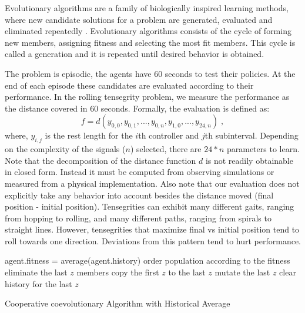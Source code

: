 \documentclass[twocolumn,10pt]{asme2ej}
\begin{document}
Evolutionary algorithms are a family of biologically inspired learning methods, where new candidate solutions for a problem are generated, evaluated and eliminated repeatedly \cite{back1997handbook}. Evolutionary algorithms consists of the cycle of  forming new members, assigning fitness and selecting the most fit members. This cycle is called a generation and it is repeated until desired behavior is obtained. 

The problem is episodic, the agents have 60 seconds to test their policies. At the end of each episode these candidates are evaluated according to their performance. In the rolling tensegrity problem, we measure the performance as the distance covered in 60 seconds. Formally, the evaluation is defined as:
\begin{equation}
\label{eq:r}
f = d(y_{0,0},y_{0,1},...,y_{0,n},y_{1,0},...,y_{24,n}) \;,
\end{equation}
where, $y_{i,j}$ is the rest length for the $i$th controller and $j$th subinterval. Depending on the complexity of the signals ($n$) selected, there are $24 * n$ parameters to learn. Note that the decomposition of the distance function $d$ is not readily obtainable in closed form. Instead it must be computed from observing simulations or measured from a physical implementation. Also note that our evaluation does not explicitly take any behavior into account besides the distance moved (final position - initial position). Tensegrities can exhibit many different gaits, ranging from hopping to rolling, and many different paths, ranging from spirals to straight lines. However, tensegrities that maximize final vs initial position tend to roll towards one direction. Deviations from this pattern tend to hurt performance.


\begin{algorithm}
 \SetAlgoLined
 {
   {
   	   agent.fitness = average(agent.history) \;
   }
 	order population according to the fitness\;
 	eliminate the last $z$ members\;
 	copy the first $z$ to the last $z$\;
 	mutate the last $z$\;
 	clear history for the last $z$\;
 }
 
\caption{Cooperative coevolutionary Algorithm with Historical Average}
\label{Alg:CCEA-AA}
\end{algorithm}
\end{document}
